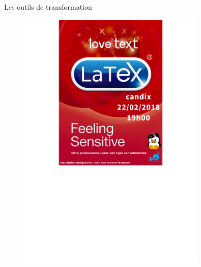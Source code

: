 \documentclass[10pt,svgnames,usenames,table]{beamer}
\begin{document}
\begin{frame}{Les outils de transformation}
\begin{overprint}
\begin{enumerate}
{				\begin{minipage}{0.45\textwidth}
				\begin{figure}
				    	\centering
				    	\includegraphics[width=0.8\textwidth]{Images/NoShear.png} 
				\end{figure}
				\end{minipage}\hfill
				\begin{minipage}{0.45\textwidth}
				\begin{figure}
				    	\centering

\end{figure}
\end{minipage}}
\end{enumerate}
\end{overprint}
\end{frame}
\end{document}
